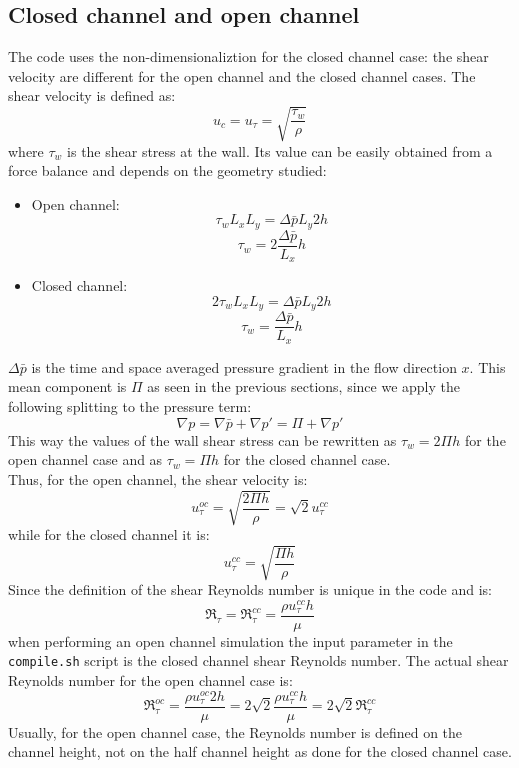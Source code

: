 \subsection{Closed channel and open channel}
The code uses the non-dimensionaliztion for the closed channel case: the shear velocity are different for the open channel and the closed channel cases. The shear velocity is defined as:
\[
u_c=u_\tau=\sqrt{\dfrac{\tau_w}{\rho}}
\]
where $\tau_w$ is the shear stress at the wall. Its value can be easily obtained from a force balance and depends on the geometry studied:
\begin{itemize}
\item Open channel:
\[
\tau_wL_xL_y=\Delta\bar p L_y 2h
\]
\[
\tau_w=2\frac{\Delta \bar p}{L_x}h
\]
\item Closed channel:
\[
2\tau_wL_xL_y=\Delta\bar p L_y 2h
\]
\[
\tau_w=\frac{\Delta \bar p}{L_x}h
\]
\end{itemize}
$\Delta \bar p$ is the time and space averaged pressure gradient in the flow direction $x$. This mean component is $\Pi$ as seen in the previous sections, since we apply the following splitting to the pressure term:
\[
\nabla p=\nabla \bar p+\nabla p'=\Pi+\nabla p'
\]
This way the values of the wall shear stress can be rewritten as $\tau_w=2\Pi h$ for the open channel case and as $\tau_w=\Pi h$ for the closed channel case.\\
Thus, for the open channel, the shear velocity is:
\begin{equation}
u_\tau^{oc}=\sqrt{\frac{2\Pi h}{\rho}}=\sqrt{2}u_\tau^{cc}
\end{equation}
while for the closed channel it is:
\begin{equation}
u_\tau^{cc}=\sqrt{\frac{\Pi h}{\rho}}
\end{equation}
Since the definition of the shear Reynolds number is unique in the code and is:
\[
\Re_\tau=\Re_\tau^{cc}=\frac{\rho u_\tau^{cc} h}{\mu}
\]
when performing an open channel simulation the input parameter in the \texttt{compile.sh} script is the closed channel shear Reynolds number. The actual shear Reynolds number for the open channel case is:
\[
\Re_\tau^{oc}=\frac{\rho u_\tau^{oc} 2h}{\mu}=2\sqrt{2}\frac{\rho u_\tau^{cc} h}{\mu}=2\sqrt{2}\Re_\tau^{cc}
\]
Usually, for the open channel case, the Reynolds number is defined on the channel height, not on the half channel height as done for the closed channel case.


